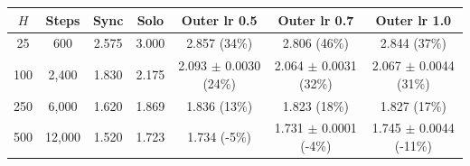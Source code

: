 \begin{tabular}{ccccccc}
\toprule
$H$ & Steps & Sync & Solo & Outer lr 0.5 & Outer lr 0.7 & Outer lr 1.0 \\
\midrule
25 & 600 & 2.575 & 3.000 & 2.857 (34\%) & 2.806 (46\%) & 2.844 (37\%) \\
100 & 2{,}400 & 1.830 & 2.175 & 2.093 $\pm$ 0.0030 (24\%) & 2.064 $\pm$ 0.0031 (32\%) & 2.067 $\pm$ 0.0044 (31\%) \\
250 & 6{,}000 & 1.620 & 1.869 & 1.836 (13\%) & 1.823 (18\%) & 1.827 (17\%) \\
500 & 12{,}000 & 1.520 & 1.723 & 1.734 (-5\%) & 1.731 $\pm$ 0.0001 (-4\%) & 1.745 $\pm$ 0.0044 (-11\%) \\
\bottomrule
\end{tabular}
